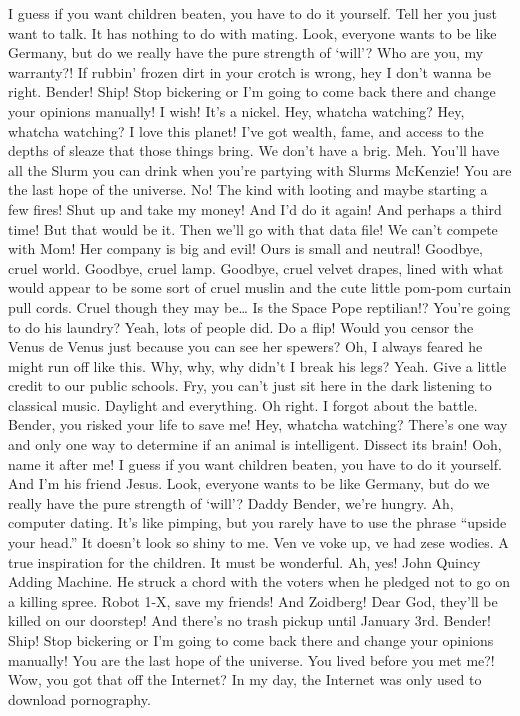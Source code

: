 \documentclass[
]{report}
\begin{document}
I guess if you want children beaten, you have to do it yourself. Tell
her you just want to talk. It has nothing to do with mating. Look,
everyone wants to be like Germany, but do we really have the pure
strength of `will'? Who are you, my warranty?! If rubbin' frozen dirt in
your crotch is wrong, hey I don't wanna be right. Bender! Ship! Stop
bickering or I'm going to come back there and change your opinions
manually! I wish! It's a nickel. Hey, whatcha watching? Hey, whatcha
watching? I love this planet! I've got wealth, fame, and access to the
depths of sleaze that those things bring. We don't have a brig. Meh.
You'll have all the Slurm you can drink when you're partying with Slurms
McKenzie! You are the last hope of the universe. No! The kind with
looting and maybe starting a few fires! Shut up and take my money! And
I'd do it again! And perhaps a third time! But that would be it. Then
we'll go with that data file! We can't compete with Mom! Her company is
big and evil! Ours is small and neutral! Goodbye, cruel world. Goodbye,
cruel lamp. Goodbye, cruel velvet drapes, lined with what would appear
to be some sort of cruel muslin and the cute little pom-pom curtain pull
cords. Cruel though they may be\ldots{} Is the Space Pope reptilian!?
You're going to do his laundry? Yeah, lots of people did. Do a flip!
Would you censor the Venus de Venus just because you can see her
spewers? Oh, I always feared he might run off like this. Why, why, why
didn't I break his legs? Yeah. Give a little credit to our public
schools. Fry, you can't just sit here in the dark listening to classical
music. Daylight and everything. Oh right. I forgot about the battle.
Bender, you risked your life to save me! Hey, whatcha watching? There's
one way and only one way to determine if an animal is intelligent.
Dissect its brain! Ooh, name it after me! I guess if you want children
beaten, you have to do it yourself. And I'm his friend Jesus. Look,
everyone wants to be like Germany, but do we really have the pure
strength of `will'? Daddy Bender, we're hungry. Ah, computer dating.
It's like pimping, but you rarely have to use the phrase ``upside your
head.'' It doesn't look so shiny to me. Ven ve voke up, ve had zese
wodies. A true inspiration for the children. It must be wonderful. Ah,
yes! John Quincy Adding Machine. He struck a chord with the voters when
he pledged not to go on a killing spree. Robot 1-X, save my friends! And
Zoidberg! Dear God, they'll be killed on our doorstep! And there's no
trash pickup until January 3rd. Bender! Ship! Stop bickering or I'm
going to come back there and change your opinions manually! You are the
last hope of the universe. You lived before you met me?! Wow, you got
that off the Internet? In my day, the Internet was only used to download
pornography.
\end{document}

